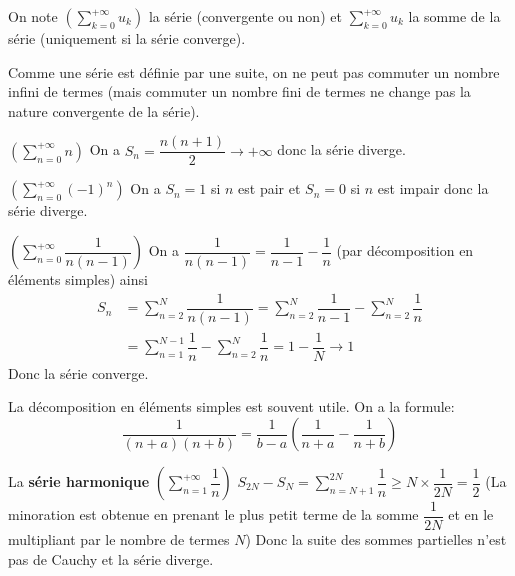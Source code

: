 \documentclass[a4paper, 12pt]{article}
\begin{document}
\begin{remarque}
    On note $(\sum\limits_{k=0}^{+\infty} u_k)$ la série (convergente ou non) et $\sum\limits_{k=0}^{+\infty} u_k$ la somme de la série (uniquement si la série converge).
\end{remarque}

\begin{remarque}
    Comme une série est définie par une suite, on ne peut pas commuter un nombre infini de termes
    (mais commuter un nombre fini de termes ne change pas la nature convergente de la série).
\end{remarque}

\begin{exemple}
    $(\sum\limits_{n=0}^{+\infty}n)$\n
    On a $S_n = \dfrac{n(n+1)}{2} \rightarrow +\infty$ donc la série diverge.
\end{exemple}

\begin{exemple}
    $(\sum\limits_{n=0}^{+\infty}(-1)^n)$\n
    On a $S_n = 1$ si $n$ est pair et $S_n = 0$ si $n$ est impair donc la série diverge.
\end{exemple}

\begin{exemple}
    $(\sum\limits_{n=0}^{+\infty}\dfrac{1}{n(n-1)})$\n
    On a $\dfrac{1}{n(n-1)} = \dfrac{1}{n-1} - \dfrac{1}{n}$ (par décomposition en éléments simples)\n
    ainsi
    \begin{align*}
        S_n &= \sum\limits_{n=2}^{N}\dfrac{1}{n(n-1)} = \sum\limits_{n=2}^{N}\dfrac{1}{n-1} - \sum\limits_{n=2}^{N}\dfrac{1}{n}\\
        &= \sum\limits_{n=1}^{N-1}\dfrac{1}{n} - \sum\limits_{n=2}^{N}\dfrac{1}{n} = 1 - \dfrac{1}{N} \rightarrow 1
    \end{align*}
    Donc la série converge.
\end{exemple}

\begin{methode}
    La décomposition en éléments simples est souvent utile.
    On a la formule:
    $$
    \dfrac{1}{(n + a)(n + b)} = \dfrac{1}{b - a}\left(\dfrac{1}{n + a} - \dfrac{1}{n + b}\right)
    $$
\end{methode}

\begin{exemple}
    La \textbf{série harmonique} $(\sum\limits_{n=1}^{+\infty}\dfrac{1}{n})$\n
    $S_{2N} - S_N = \sum\limits_{n=N+1}^{2N}\dfrac{1}{n} \geq N \times \dfrac{1}{2N} = \dfrac{1}{2}$\n
    (La minoration est obtenue en prenant le plus petit terme de la somme $\dfrac{1}{2N}$ et en le multipliant par le nombre de termes $N$)\n
    Donc la suite des sommes partielles n'est pas de Cauchy et la série diverge.
\end{exemple}
\end{document}

